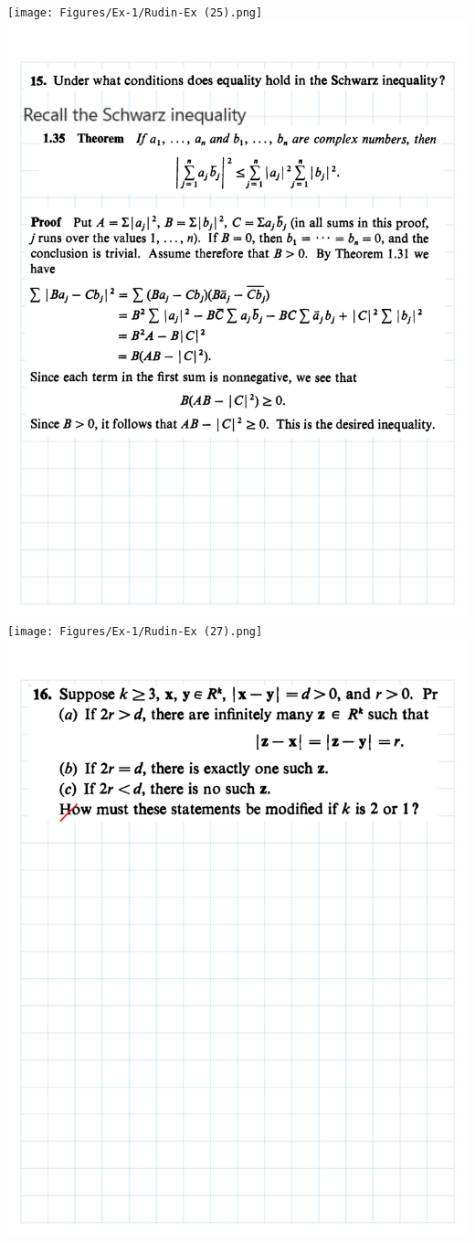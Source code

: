\documentclass[
]{book}
\theoremstyle{definition}
\theoremstyle{definition}
\theoremstyle{definition}
\theoremstyle{definition}
\theoremstyle{remark}
\begin{document}
\texttt{[image: Figures/Ex-1/Rudin-Ex (25).png]}
\includegraphics{Figures/Ex-1/Rudin-Ex (26).png}
\texttt{[image: Figures/Ex-1/Rudin-Ex (27).png]}
\includegraphics{Figures/Ex-1/Rudin-Ex (28).png}
\end{document}
